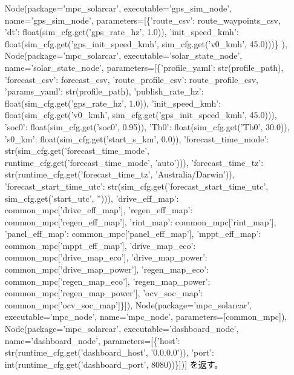 \documentclass[a4paper,11pt]{article}
\begin{document}
\begin{enumerate}[leftmargin=1.8em]
\item [Node(package='mpc\_solarcar', executable='gps\_sim\_node', name='gps\_sim\_node', parameters=[\{'route\_csv': route\_waypoints\_csv, 'dt': float(sim\_cfg.get('gps\_rate\_hz', 1.0)), 'init\_speed\_kmh': float(sim\_cfg.get('gps\_init\_speed\_kmh', sim\_cfg.get('v0\_kmh', 45.0)))\}]), Node(package='mpc\_solarcar', executable='solar\_state\_node', name='solar\_state\_node', parameters=[\{'profile\_yaml': str(profile\_path), 'forecast\_csv': forecast\_csv, 'route\_profile\_csv': route\_profile\_csv, 'params\_yaml': str(profile\_path), 'publish\_rate\_hz': float(sim\_cfg.get('gps\_rate\_hz', 1.0)), 'init\_speed\_kmh': float(sim\_cfg.get('v0\_kmh', sim\_cfg.get('gps\_init\_speed\_kmh', 45.0))), 'soc0': float(sim\_cfg.get('soc0', 0.95)), 'Tb0': float(sim\_cfg.get('Tb0', 30.0)), 's0\_km': float(sim\_cfg.get('start\_s\_km', 0.0)), 'forecast\_time\_mode': str(sim\_cfg.get('forecast\_time\_mode', runtime\_cfg.get('forecast\_time\_mode', 'auto'))), 'forecast\_time\_tz': str(runtime\_cfg.get('forecast\_time\_tz', 'Australia/Darwin')), 'forecast\_start\_time\_utc': str(sim\_cfg.get('forecast\_start\_time\_utc', sim\_cfg.get('start\_utc', ''))), 'drive\_eff\_map': common\_mpc['drive\_eff\_map'], 'regen\_eff\_map': common\_mpc['regen\_eff\_map'], 'rint\_map': common\_mpc['rint\_map'], 'panel\_eff\_map': common\_mpc['panel\_eff\_map'], 'mppt\_eff\_map': common\_mpc['mppt\_eff\_map'], 'drive\_map\_eco': common\_mpc['drive\_map\_eco'], 'drive\_map\_power': common\_mpc['drive\_map\_power'], 'regen\_map\_eco': common\_mpc['regen\_map\_eco'], 'regen\_map\_power': common\_mpc['regen\_map\_power'], 'ocv\_soc\_map': common\_mpc['ocv\_soc\_map']\}]), Node(package='mpc\_solarcar', executable='mpc\_node', name='mpc\_node', parameters=[common\_mpc]), Node(package='mpc\_solarcar', executable='dashboard\_node', name='dashboard\_node', parameters=[\{'host': str(runtime\_cfg.get('dashboard\_host', '0.0.0.0')), 'port': int(runtime\_cfg.get('dashboard\_port', 8080))\}])] を返す。
            \end{enumerate}
\end{document}
